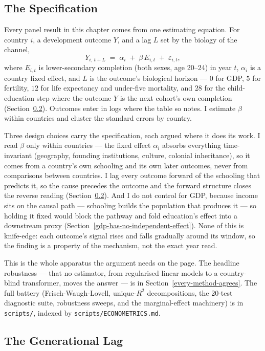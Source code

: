 \documentclass[12pt,letterpaper]{article}
\begin{document}
\subsection{The Specification}\label{the-specification}

Every panel result in this chapter comes from one estimating equation.
For country $i$, a development outcome $Y$, and a lag $L$ set by the
biology of the channel,
\[
Y_{i,\,t+L} \;=\; \alpha_i \;+\; \beta\,E_{i,t} \;+\; \varepsilon_{i,t},
\]
where $E_{i,t}$ is lower-secondary completion (both sexes, age 20--24)
in year $t$, $\alpha_i$ is a country fixed effect, and $L$ is the
outcome's biological horizon --- $0$ for GDP, $5$ for fertility, $12$
for life expectancy and under-five mortality, and $28$ for the
child-education step where the outcome $Y$ is the next cohort's own
completion (Section~\ref{the-generational-lag}). Outcomes enter in logs
where the table so notes. I estimate $\beta$ within countries and
cluster the standard errors by country.

Three design choices carry the specification, each argued where it does
its work. I read $\beta$ only within countries --- the fixed effect
$\alpha_i$ absorbs everything time-invariant (geography, founding
institutions, culture, colonial inheritance), so it comes from a
country's own schooling and its own later outcomes, never from
comparisons between countries. I lag every outcome forward of the
schooling that predicts it, so the cause precedes the outcome and the
forward structure closes the reverse reading
(Section~\ref{the-generational-lag}). And I do not control for GDP,
because income sits on the causal path --- schooling builds the
population that produces it --- so holding it fixed would block the
pathway and fold education's effect into a downstream proxy
(Section~\ref{gdp-has-no-independent-effect}). None of this is
knife-edge: each outcome's signal rises and falls gradually around its
window, so the finding is a property of the mechanism, not the exact
year read.

This is the whole apparatus the argument needs on the page. The
headline robustness --- that no estimator, from regularised linear
models to a country-blind transformer, moves the answer --- is in
Section~\ref{every-method-agrees}. The full battery (Frisch-Waugh-Lovell,
unique-$R^2$ decompositions, the 20-test diagnostic suite, robustness
sweeps, and the marginal-effect machinery) is in \texttt{scripts/},
indexed by \texttt{scripts/ECONOMETRICS.md}.

\subsection{The Generational Lag}\label{the-generational-lag}
\end{document}
